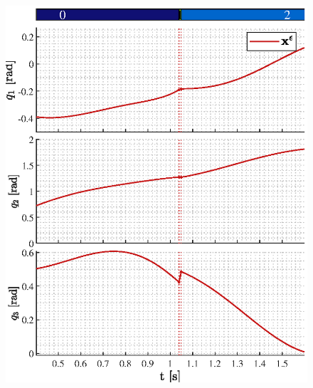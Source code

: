 \documentclass[../DC2019003Bouma.tex]{subfiles}
\begin{document}
\begin{figure}[bt!]
\centering
\begin{minipage}[c]{.48\textwidth}
\centering
\includegraphics[width=\textwidth]{xepos.eps}
\end{minipage}
\begin{minipage}[c]{.48\textwidth}
\centering

\end{minipage}
\end{figure}
\end{document}
